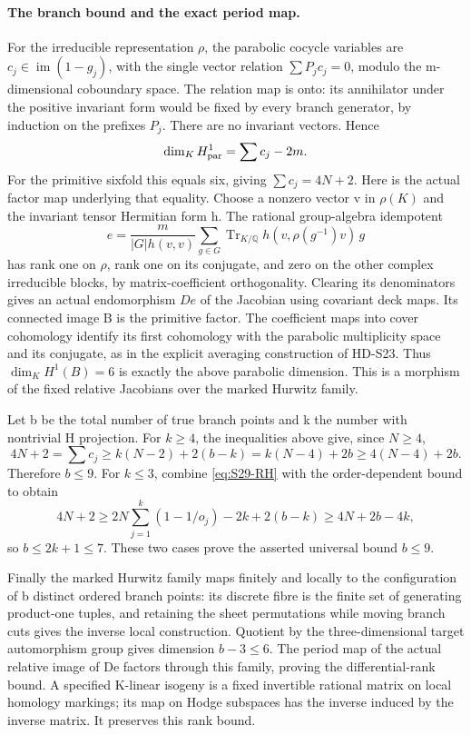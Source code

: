 \paragraph{The branch bound and the exact period map.}
For the irreducible representation \(\rho\), the parabolic
cocycle variables are \(c_j\in\operatorname{im}(1-g_j)\),
with the single vector relation \(\sum P_jc_j=0\), modulo
the m-dimensional coboundary space. The relation map is onto: its
annihilator under the positive invariant form would be fixed by every
branch generator, by induction on the prefixes \(P_j\). There
are no invariant vectors. Hence
\[
             \dim_K H^1_{\rm par}=\sum c_j-2m.
\]
For the primitive sixfold this equals six, giving
\(\sum c_j=4N+2\). Here is the actual factor map underlying
that equality. Choose a nonzero vector v in \(\rho(K)\) and
the invariant tensor Hermitian form h. The rational group-algebra
idempotent
\[
 e=\frac{m}{|G|h(v,v)}\sum_{g\in G}
       \operatorname{Tr}_{K/\mathbb Q}h(v,\rho(g^{-1})v)\,g
\]
has rank one on \(\rho\), rank one on its conjugate, and zero
on the other complex irreducible blocks, by matrix-coefficient
orthogonality. Clearing its denominators gives an actual endomorphism
\(De\) of the Jacobian using covariant deck maps. Its connected
image B is the primitive factor. The coefficient maps into cover
cohomology identify its first cohomology with the parabolic
multiplicity space and its conjugate, as in the explicit averaging
construction of HD-S23. Thus \(\dim_K H^1(B)=6\) is exactly
the above parabolic dimension. This is a morphism of the fixed relative
Jacobians over the marked Hurwitz family.

Let b be the total number of true branch points and k the number with
nontrivial H projection. For \(k\ge4\), the inequalities above
give, since \(N\ge4\),
\[
 4N+2=\sum c_j\ge k(N-2)+2(b-k)
       =k(N-4)+2b\ge4(N-4)+2b.
\]
Therefore \(b\le9\). For \(k\le3\), combine
\eqref{eq:S29-RH} with the order-dependent bound to obtain
\[
 4N+2\ge2N\sum_{j=1}^k(1-1/o_j)-2k+2(b-k)
       \ge4N+2b-4k,
\]
so \(b\le2k+1\le7\). These two cases prove the asserted
universal bound \(b\le9\).

Finally the marked Hurwitz family maps finitely and locally to the
configuration of b distinct ordered branch points: its discrete fibre
is the finite set of generating product-one tuples, and retaining the
sheet permutations while moving branch cuts gives the inverse local
construction. Quotient by the three-dimensional target automorphism
group gives dimension \(b-3\le6\). The period map of the
actual relative image of De factors through this family, proving the
differential-rank bound. A specified K-linear isogeny is a fixed
invertible rational matrix on local homology markings; its map on
Hodge subspaces has the inverse induced by the inverse matrix.
It preserves this rank bound.

